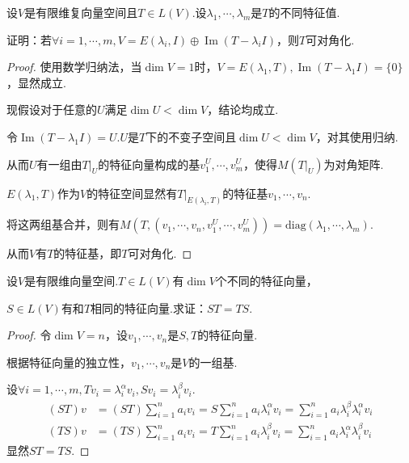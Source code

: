 \begin{problem}[5]\label{5.C.5}
    设\(V\)是有限维复向量空间且\(T \in L(V)\).设\(\lambda_1,\cdots,\lambda_m\)是\(T\)的不同特征值.

    证明：若\(\forall i=1,\cdots,m,V=E(\lambda_i,I) \oplus \operatorname{Im}(T-\lambda_i I)\)，则\(T\)可对角化.
\end{problem}

\begin{proof}
    使用数学归纳法，当\(\dim V=1\)时，\(V=E(\lambda_1,T),\operatorname{Im}(T-\lambda_1 I)=\{0\}\)，显然成立.

    现假设对于任意的\(U\)满足\(\dim U<\dim V\)，结论均成立.
    
    令\(\operatorname{Im}(T-\lambda_1 I)=U\).\(U\)是\(T\)下的不变子空间且\(\dim U<\dim V\)，对其使用归纳.
    
    从而\(U\)有一组由\(T|_U\)的特征向量构成的基\(v_1^U,\cdots,v_m^U\)，使得\(M(T|_U)\)为对角矩阵.
    
    \(E(\lambda_1,T)\)作为\(V\)的特征空间显然有\(T|_{E(\lambda_i,T)}\)的特征基\(v_1,\cdots,v_n\).
    
    将这两组基合并，则有\(M(T,(v_1,\cdots,v_n,v_1^U,\cdots,v_m^U))=\mathrm{diag}(\lambda_1,\cdots,\lambda_m)\).
    
    从而\(V\)有\(T\)的特征基，即\(T\)可对角化.
\end{proof}

\newpage

\begin{problem}[6]\label{5.C.6}
    设\(V\)是有限维向量空间.\(T \in L(V)\)有\(\dim V\)个不同的特征向量，

    \(S \in L(V)\)有和\(T\)相同的特征向量.求证：\(ST=TS\).
\end{problem}

\begin{proof}
    令\(\dim V=n\)，设\(v_1,\cdots,v_n\)是\(S,T\)的特征向量.

    根据特征向量的独立性，\(v_1,\cdots,v_n\)是\(V\)的一组基.
    
    设\(\forall i=1,\cdots,m,Tv_i=\lambda_i^\alpha v_i,Sv_i=\lambda_i^\beta v_i\).
    \begin{align*}
        (ST)v &=(ST)\sum_{i=1}^n a_iv_i=S\sum_{i=1}^n a_i \lambda_i^\alpha v_i
                =\sum_{i=1}^n a_i \lambda_i^\beta \lambda_i^\alpha v_i \\
        (TS)v &=(TS)\sum_{i=1}^n a_iv_i=T\sum_{i=1}^n a_i \lambda_i^\beta v_i
                =\sum_{i=1}^n a_i \lambda_i^\alpha \lambda_i^\beta v_i
    \end{align*}
    显然\(ST=TS\).
\end{proof}

